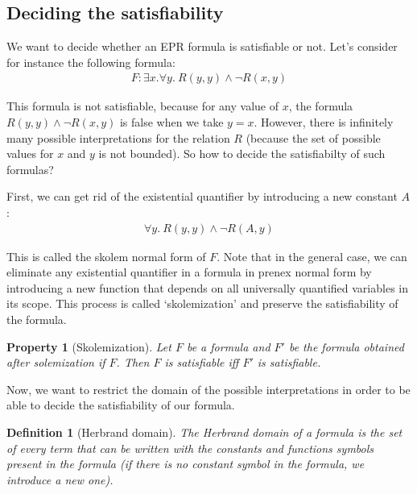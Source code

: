 \documentclass[11pt,a4paper,oldfontcommands,openany]{memoir}
\newtheorem*{definition}{Definition}
\newtheorem*{property}{Property}
\begin{document}
        \subsection{Deciding the satisfiability}

        We want to decide whether an EPR formula is satisfiable or not. Let's consider for instance the following formula:
        \begin{align*}
            F: \exists x. \forall y. \ R(y,y) \land \neg R(x,y)
        \end{align*}

        This formula is not satisfiable, because for any value of \(x\), the formula \(R(y,y) \land \neg R(x,y)\) is false when we take \(y=x\).
        However, there is infinitely many possible interpretations for the relation \(R\) (because the set of possible values for \(x\) and \(y\) is not bounded).
        So how to decide the satisfiabilty of such formulas?

        First, we can get rid of the existential quantifier by introducing a new constant \(A\):
        \begin{align*}
            \forall y. \ R(y,y) \land \neg R(A,y)
        \end{align*}

        This is called the skolem normal form of \(F\).
        Note that in the general case, we can eliminate any existential quantifier in a formula in prenex normal form by introducing a new function
        that depends on all universally quantified variables in its scope. This process is called `skolemization' and preserve the satisfiability of the formula.

        \begin{property}[Skolemization]
            Let \(F\) be a formula and \(F'\) be the formula obtained after solemization if \(F\). Then \(F\) is satisfiable iff \(F'\) is satisfiable.
        \end{property}

        Now, we want to restrict the domain of the possible interpretations in order to be able to decide the satisfiability of our formula.

        \begin{definition}[Herbrand domain]
            The Herbrand domain of a formula is the set of every term that can be written with the constants and functions symbols present in the formula
            (if there is no constant symbol in the formula, we introduce a new one).
        \end{definition}
\end{document}
